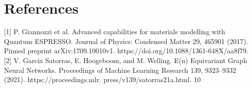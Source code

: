 \documentclass[11pt]{article}
\begin{document}
\section*{References}

[1] P. Giannozzi et al. Advanced capabilities for materials modelling with Quantum ESPRESSO.
Journal of Physics: Condensed Matter 29, 465901 (2017). Pinned preprint arXiv:1709.10010v1.
https://doi.org/10.1088/1361-648X/aa8f79.
[2] V. Garcia Satorras, E. Hoogeboom, and M. Welling. E(n) Equivariant Graph Neural Networks.
Proceedings of Machine Learning Research 139, 9323–9332 (2021). https://proceedings.mlr.
press/v139/satorras21a.html.
10
\end{document}
